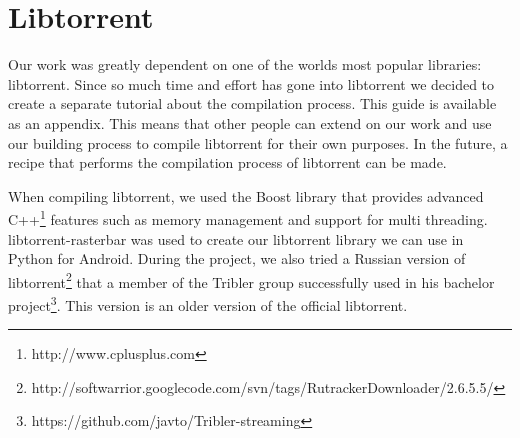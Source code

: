 \section{Libtorrent}
	Our work was greatly dependent on one of the worlds most popular libraries: libtorrent. Since so much time and effort has gone into libtorrent  we decided to create a separate tutorial about the compilation process. This guide is available as an appendix. This means that other people can extend on our work and use our building process to compile libtorrent for their own purposes. In the future, a recipe that performs the compilation process of libtorrent can be made.
	
	When compiling libtorrent, we used the Boost library that provides advanced C++\footnote{http://www.cplusplus.com} features such as memory management and support for multi threading. libtorrent-rasterbar was used to create our libtorrent library we can use in Python for Android. During the project, we also tried a Russian version of libtorrent\footnote{http://softwarrior.googlecode.com/svn/tags/RutrackerDownloader/2.6.5.5/} that a member of the Tribler group successfully used in his bachelor project\footnote{https://github.com/javto/Tribler-streaming}. This version is an older version of the official libtorrent.